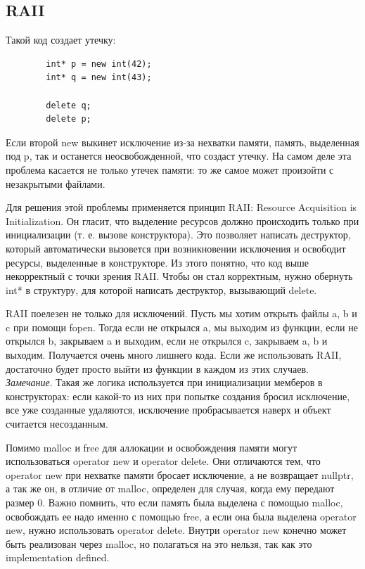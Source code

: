 \documentclass[12pt, a4paper]{article}
\begin{document}
	\subsection{RAII}
	Такой код создает утечку:
	\begin{verbatim}
		int* p = new int(42);
		int* q = new int(43);
		
		delete q;
		delete p;
	\end{verbatim}
	Если второй new выкинет исключение из-за нехватки памяти, память, выделенная под p, так и останется неосвобожденной, что создаст утечку. На самом деле эта проблема касается не только утечек памяти: то же самое может произойти с незакрытыми файлами.
	\par Для решения этой проблемы применяется принцип RAII: Resource Acquisition is Initialization. Он гласит, что выделение ресурсов должно происходить только при инициализации (т. е. вызове конструктора). Это позволяет написать деструктор, который автоматически вызовется при возникновении исключения и освободит ресурсы, выделенные в конструкторе. Из этого понятно, что код выше некорректный с точки зрения RAII. Чтобы он стал корректным, нужно обернуть int* в структуру, для которой написать деструктор, вызывающий delete.
	\\\par RAII поелезен не только для исключений. Пусть мы хотим открыть файлы a, b и c при помощи fopen. Тогда если не открылся a, мы выходим из функции, если не открылся b, закрываем a и выходим, если не открылся c, закрываем a, b и выходим. Получается очень много лишнего кода. Если же использовать RAII, достаточно будет просто выйти из функции в каждом из этих случаев.\\
	\textit{Замечание}. Такая же логика используется при инициализации мемберов в конструкторах: если какой-то из них при попытке создания бросил исключение, все уже созданные удаляются, исключение пробрасывается наверх и объект считается несозданным.
	\\\par Помимо malloc и free для аллокации и освобождения памяти могут использоваться operator new и operator delete. Они отличаются тем, что operator new при нехватке памяти бросает исключение, а не возвращает nullptr, а так же он, в отличие от malloc, определен для случая, когда ему передают размер 0. Важно помнить, что если память была выделена с помощью malloc, освобождать ее надо именно с помощью free, а если она была выделена operator new, нужно использовать operator delete. Внутри operator new конечно может быть реализован через malloc, но полагаться на это нельзя, так как это implementation defined.
\end{document}
